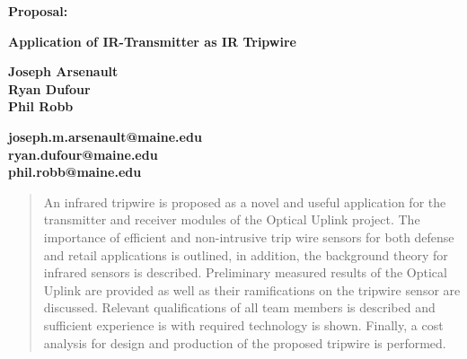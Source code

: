 \documentclass{article}
\begin{document}


\begin{titlepage}
    \begin{center}
        
         \vspace*{1.5cm}
        
         \textbf{{\Huge Proposal: }}
        
         \vspace{0.5cm}
         \textbf{Application of IR-Transmitter as IR Tripwire}
        
          \vspace{.5cm}
        
         \textbf{{\Large Joseph Arsenault \\ Ryan Dufour \\ Phil Robb \newline}}
    \vspace{.4cm}
    	
    	\textbf{joseph.m.arsenault@maine.edu \\ ryan.dufour@maine.edu \\ phil.robb@maine.edu}
    	
    \vspace{1cm}
    
        
        
        \begin{abstract}
        
        
        
        \noindent 
       An infrared tripwire is proposed as a novel and useful application for the transmitter and receiver modules of the Optical Uplink project. The importance of efficient and non-intrusive trip wire sensors for both defense and retail applications is outlined, in addition, the background theory for infrared sensors is described. Preliminary measured results of the Optical Uplink are provided as well as their ramifications on the tripwire sensor are discussed. Relevant qualifications of all team members is described and sufficient experience is with required technology is shown. Finally, a cost analysis for design and production of the proposed tripwire is performed.
        
        
        
        \end{abstract}
        

\end{center}
\end{titlepage}
\end{document}
